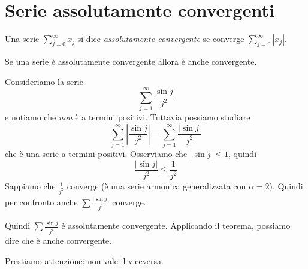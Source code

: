 \section{Serie assolutamente convergenti}
\begin{definition}
Una serie $\sum_{j=0}^\infty x_j$ si dice \emph{assolutamente convergente} se converge $\sum_{j=0}^\infty |x_j|$.
\end{definition}

\begin{theorem}
Se una serie è assolutamente convergente allora è anche convergente.
\end{theorem}

\begin{example}
Consideriamo la serie
\begin{equation*}
\sum_{j=1}^\infty \frac{\sin j}{j^2}
\end{equation*}
e notiamo che \emph{non} è a termini positivi. Tuttavia possiamo studiare 
\begin{equation*}
\sum_{j=1}^\infty \left\lvert \frac{\sin j}{j^2} \right\rvert = \sum_{j=1}^\infty \frac{|\sin j|}{j^2}
\end{equation*}
che è una serie a termini positivi. Osserviamo che $|\sin j| \le 1$, quindi
\begin{equation*}
\frac{|\sin j|}{j^2} \le \frac{1}{j^2}
\end{equation*}
Sappiamo che $\frac{1}{j^2}$ converge (è una serie armonica generalizzata con $\alpha = 2$). Quindi per confronto anche $\sum \frac{|\sin j|}{j^2}$ converge.

Quindi $\sum \frac{\sin j}{j^2}$ è assolutamente convergente. Applicando il teorema, possiamo dire che è anche convergente.
\end{example}

Prestiamo attenzione: non vale il viceversa.